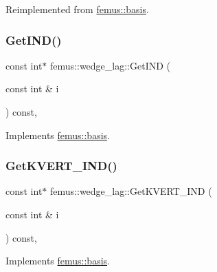 Reimplemented from \mbox{\hyperlink{classfemus_1_1basis_a2ba867dcfa634c47f1c52caddd9bfdba}{femus\+::basis}}.

\mbox{\label{classfemus_1_1wedge__lag_a984c32fdfe395886e9cba8a335f845b7}} 
\subsubsection{\texorpdfstring{Get\+I\+N\+D()}{GetIND()}}
{\footnotesize\ttfamily const int$\ast$ femus\+::wedge\+\_\+lag\+::\+Get\+I\+ND (\begin{DoxyParamCaption}\item[{const int \&}]{i }\end{DoxyParamCaption}) const\hspace{0.3cm}{\ttfamily [inline]}, {\ttfamily [virtual]}}



Implements \mbox{\hyperlink{classfemus_1_1basis_a3f63ad97ce70cd4a1196ede69f1f144b}{femus\+::basis}}.

\mbox{\label{classfemus_1_1wedge__lag_ac966f6d982d2a0aa7231ae1a5e731800}} 
\subsubsection{\texorpdfstring{Get\+K\+V\+E\+R\+T\+\_\+\+I\+N\+D()}{GetKVERT\_IND()}}
{\footnotesize\ttfamily const int$\ast$ femus\+::wedge\+\_\+lag\+::\+Get\+K\+V\+E\+R\+T\+\_\+\+I\+ND (\begin{DoxyParamCaption}\item[{const int \&}]{i }\end{DoxyParamCaption}) const\hspace{0.3cm}{\ttfamily [inline]}, {\ttfamily [virtual]}}



Implements \mbox{\hyperlink{classfemus_1_1basis_a95ceb3feae4c484b0baa6a4d35d38909}{femus\+::basis}}.

\mbox{\label{classfemus_1_1wedge__lag_a61a63f8c6773d01c707d49a3038951b3}} 
